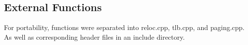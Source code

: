 \documentclass[11pt]{article}
\begin{document}
\begin{multicols}{2}
\subsection{External Functions}
For portability, functions were separated into reloc.cpp, tlb.cpp, and paging.cpp. As well as corresponding header files in an include directory.


\end{multicols}

\end{document}
